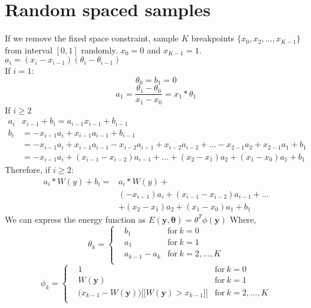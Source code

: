 \documentclass{article}
\begin{document}
	\section{Random spaced samples}
	If we remove the fixed space constraint, sample $K$ breakpoints $\{x_0,x_2,\dots,x_{K-1}\}$ from interval $[0,1]$ randomly. $x_0=0$ and $x_{K-1}=1$.\\
	$a_i=(x_i-x_{i-1})(\theta_i-\theta_{i-1})$\\
	If $i =1$:
	$$
	\theta_0=b_1 = 0
	$$
	$$
	a_1 =\frac{\theta_1-\theta_0}{x_1-x_0}= x_1*\theta_1
	$$
	If $i \geq 2$
	\begin{align*}
	a_i&x_{i-1}+b_i = a_{i-1}x_{i-1}+b_{i-1}\\
	b_i&= -x_{i-1}a_i+x_{i-1}a_{i-1}+b_{i-1}\\
	&=-x_{i-1}a_i+x_{i-1}a_{i-1}-x_{i-2}a_{i-1}+x_{i-2}a_{i-2}+\dots-x_{2-1}a_2+x_{2-1}a_1+b_1\\
	&=-x_{i-1}a_i+(x_{i-1}-x_{i-2})a_{i-1}+\dots+(x_2-x_1)a_2+(x_1-x_0)a_1+b_1
	\end{align*}
	Therefore, if $i \geq 2$:
	\begin{align*}
	a_i*W(y)+b_i=&a_i*W(y)+\\
	&(-x_{i-1})a_i+(x_{i-1}-x_{i-2})a_{i-1}+\dots\\
	&+(x_2-x_1)a_2+(x_1-x_0)a_1+b_1
	\end{align*}
	We can express the energy function as $E(\mathbf{y},\mathbf{\theta})=\mathbb{\theta}^T\phi(\mathbf{y})$
	Where,
	\begin{equation*}
	\theta_k = \left\{
	\begin{aligned}
	& b_1	& \text{for} \ k=0\\
	& a_1 & \text{for}\ k=1\\
	& a_{k-1}-a_k  & \text{for} \ k=2,\dots,K\\
	\end{aligned}
	\right.
	\end{equation*}
	\begin{equation*}
	\phi_k = \left\{
	\begin{aligned}
	& 1	& \text{for} \ k=0\\
	& W(\mathbf{y}) & \text{for}\ k=1\\
	& \bigg(x_{k-1}-W(\mathbf{y}) \bigg)\bigg[\bigg[ W(\mathbf{y}) > x_{k-1}\bigg]\bigg]  & \text{for} \ k=2,\dots,K\\
	\end{aligned}
	\right.
	\end{equation*}
\end{document}
